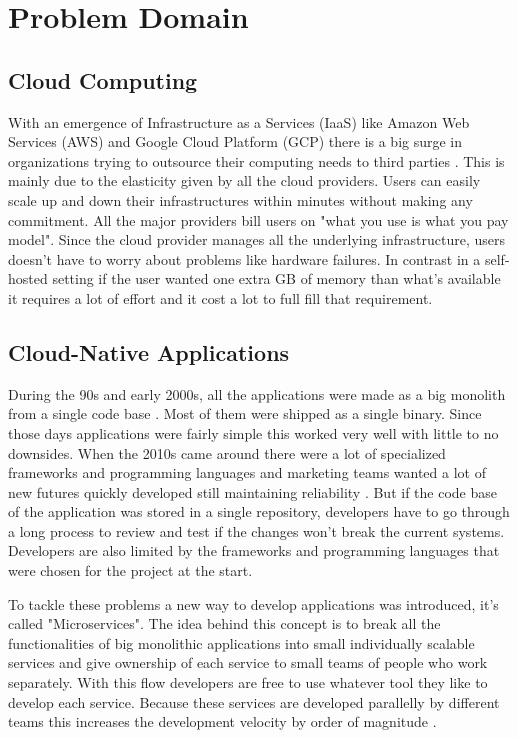\section{Problem Domain}

\subsection{Cloud Computing}
With an emergence of Infrastructure as a Services (IaaS) like Amazon Web Services (AWS) and Google Cloud Platform (GCP) there is a big surge in organizations trying to outsource their computing needs to third parties \citep{rimol_2021}. This is mainly due to the elasticity given by all the cloud providers. Users can easily scale up and down their infrastructures within minutes without making any commitment. All the major providers bill users on "what you use is what you pay model". Since the cloud provider manages all the underlying infrastructure, users doesn't have to worry about problems like hardware failures. In contrast in a self-hosted setting if the user wanted one extra GB of memory than what's available it requires a lot of effort and it cost a lot to full fill that requirement.

\subsection{Cloud-Native Applications}
During the 90s and early 2000s, all the applications were made as a big monolith from a single code base \citep{LessonsF52:online}. Most of them were shipped as a single binary. Since those days applications were fairly simple this worked very well with little to no downsides. When the 2010s came around there were a lot of specialized frameworks and programming languages and marketing teams wanted a lot of new futures quickly developed still maintaining reliability \citep{di2018migrating,Microser52:online}. But if the code base of the application was stored in a single repository, developers have to go through a long process to review and test if the changes won't break the current systems. Developers are also limited by the frameworks and programming languages that were chosen for the project at the start.

To tackle these problems a new way to develop applications was introduced, it's called "Microservices". The idea behind this concept is to break all the functionalities of big monolithic applications into small individually scalable services and give ownership of each service to small teams of people who work separately. With this flow developers are free to use whatever tool they like to develop each service. Because these services are developed parallelly by different teams this increases the development velocity by order of magnitude \citep{Understa56:online}.

